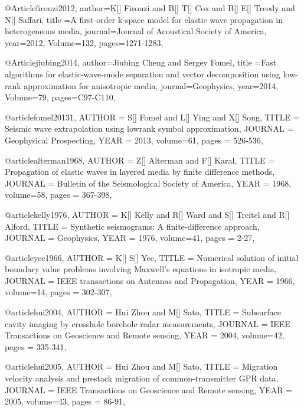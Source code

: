 @Article{firouzi2012,
  author={K[] Firouzi and B[] T[] Cox and B[] E[] Treedy and N[] Saffari},
  title ={A first-order k-space model for elastic wave propagation in heterogeneous media},
  journal={Journal of Acoustical Society of America},
  year=2012,
  Volume=132,
  pages={1271-1283},
}


@Article{jiubing2014,
  author={Jiubing Cheng and Sergey Fomel},
  title ={Fast algorithms for elastic-wave-mode separation and vector decomposition using low-rank approximation for anisotropic media},
  journal={Geophysics},
  year=2014,
  Volume=79,
  pages={C97-C110},
}

@article{fomel20131,
  AUTHOR =       {S[] Fomel and L[] Ying and X[] Song},
  TITLE =        {Seismic wave extrapolation using lowrank symbol approximation},
  JOURNAL =      {Geophysical Prospecting},
  YEAR =         {2013},
  volume=61,
  pages = {526-536},
}

@article{alterman1968,
  AUTHOR =       {Z[] Alterman and F[] Karal},
  TITLE =        {Propagation of elastic waves in layered media by finite difference methods},
  JOURNAL =      {Bulletin of the Seismological Society of America},
  YEAR =         {1968},
  volume=58,
  pages = {367-398},
}

@article{kelly1976,
  AUTHOR =       {K[] Kelly and R[] Ward and S[] Treitel and R[] Alford},
  TITLE =        {Synthetic seismograms: A finite-difference approach},
  JOURNAL =      {Geophysics},
  YEAR =         {1976},
  volume=41,
  pages = {2-27},
}

@article{yee1966,
  AUTHOR =       {K[] S[] Yee},
  TITLE =        {Numerical solution of initial boundary value problems involving Maxwell's equations in isotropic media},
  JOURNAL =      {IEEE transactions on Antennas and Propagation},
  YEAR =         {1966},
  volume=14,
  pages = {302-307},
}

@article{hui2004,
  AUTHOR =       {Hui Zhou and M[] Sato},
  TITLE =        {Subsurface cavity imaging by crosshole borehole radar measurements},
  JOURNAL =      {IEEE Transactions on Geoscience and Remote sensing},
  YEAR =         {2004},
  volume=42,
  pages = {335-341},
}



@article{hui2005,
  AUTHOR =       {Hui Zhou and M[] Sato},
  TITLE =        {Migration velocity analysis and prestack migration of common-transmitter GPR data},
  JOURNAL =      {IEEE Transactions on Geoscience and Remote sensing},
  YEAR =         {2005},
  volume=43,
  pages = {86-91},
}

